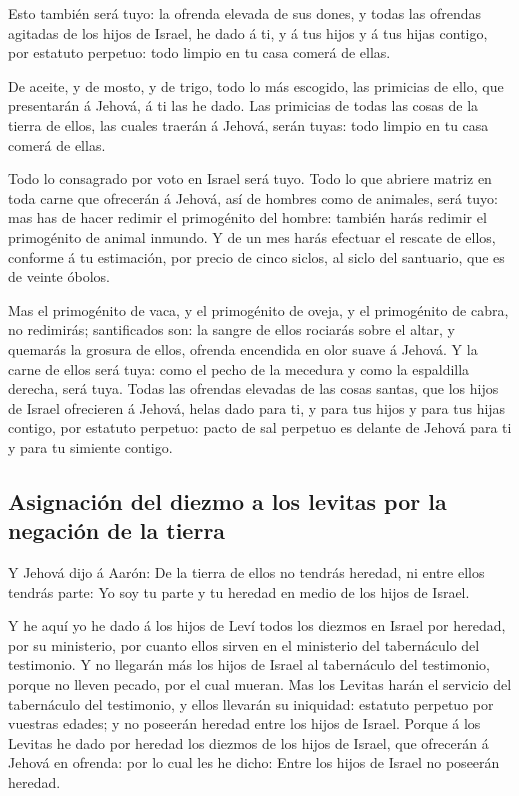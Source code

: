  Esto también será tuyo: la ofrenda elevada de sus dones, y
todas las ofrendas agitadas de los hijos de Israel, he dado á ti, y á
tus hijos y á tus hijas contigo, por estatuto perpetuo: todo limpio en
tu casa comerá de ellas.

 De aceite, y de mosto, y de trigo, todo lo más escogido,
las primicias de ello, que presentarán á Jehová, á ti las he dado.
 Las primicias de todas las cosas de la tierra de ellos,
las cuales traerán á Jehová, serán tuyas: todo limpio en tu casa comerá
de ellas.

 Todo lo consagrado por voto en Israel será tuyo.
 Todo lo que abriere matriz en toda carne que ofrecerán á
Jehová, así de hombres como de animales, será tuyo: mas has de hacer
redimir el primogénito del hombre: también harás redimir el primogénito
de animal inmundo.  Y de un mes harás efectuar el rescate
de ellos, conforme á tu estimación, por precio de cinco siclos, al siclo
del santuario, que es de veinte óbolos.

 Mas el primogénito de vaca, y el primogénito de oveja, y
el primogénito de cabra, no redimirás; santificados son: la sangre de
ellos rociarás sobre el altar, y quemarás la grosura de ellos, ofrenda
encendida en olor suave á Jehová.  Y la carne de ellos será
tuya: como el pecho de la mecedura y como la espaldilla derecha, será
tuya.  Todas las ofrendas elevadas de las cosas santas, que
los hijos de Israel ofrecieren á Jehová, helas dado para ti, y para tus
hijos y para tus hijas contigo, por estatuto perpetuo: pacto de sal
perpetuo es delante de Jehová para ti y para tu simiente contigo.

\hypertarget{asignaciuxf3n-del-diezmo-a-los-levitas-por-la-negaciuxf3n-de-la-tierra}{%
\subsection{Asignación del diezmo a los levitas por la negación de la
tierra}\label{asignaciuxf3n-del-diezmo-a-los-levitas-por-la-negaciuxf3n-de-la-tierra}}

 Y Jehová dijo á Aarón: De la tierra de ellos no tendrás
heredad, ni entre ellos tendrás parte: Yo soy tu parte y tu heredad en
medio de los hijos de Israel.

 Y he aquí yo he dado á los hijos de Leví todos los diezmos
en Israel por heredad, por su ministerio, por cuanto ellos sirven en el
ministerio del tabernáculo del testimonio.  Y no llegarán
más los hijos de Israel al tabernáculo del testimonio, porque no lleven
pecado, por el cual mueran.  Mas los Levitas harán el
servicio del tabernáculo del testimonio, y ellos llevarán su iniquidad:
estatuto perpetuo por vuestras edades; y no poseerán heredad entre los
hijos de Israel.  Porque á los Levitas he dado por heredad
los diezmos de los hijos de Israel, que ofrecerán á Jehová en ofrenda:
por lo cual les he dicho: Entre los hijos de Israel no poseerán heredad.

